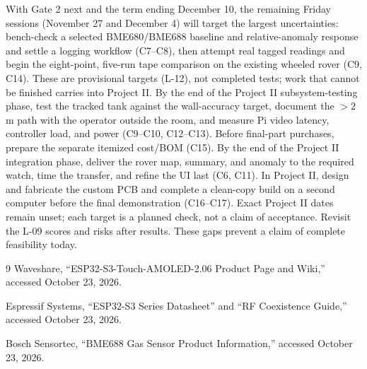 \documentclass[conference,onecolumn,letterpaper]{IEEEtran}
\begin{document}
With Gate 2 next and the term ending December 10, the remaining Friday sessions (November 27 and December 4) will target the largest uncertainties: bench-check a selected BME680/BME688 baseline and relative-anomaly response and settle a logging workflow (C7--C8), then attempt real tagged readings and begin the eight-point, five-run tape comparison on the existing wheeled rover (C9, C14). These are provisional targets (L-12), not completed tests; work that cannot be finished carries into Project II. By the end of the Project II subsystem-testing phase, test the tracked tank against the wall-accuracy target, document the $>2$ m path with the operator outside the room, and measure Pi video latency, controller load, and power (C9--C10, C12--C13). Before final-part purchases, prepare the separate itemized cost/BOM (C15). By the end of the Project II integration phase, deliver the rover map, summary, and anomaly to the required watch, time the transfer, and refine the UI last (C6, C11). In Project II, design and fabricate the custom PCB and complete a clean-copy build on a second computer before the final demonstration (C16--C17). Exact Project II dates remain unset; each target is a planned check, not a claim of acceptance. Revisit the L-09 scores and risks after results. These gaps prevent a claim of complete feasibility today.

\begin{thebibliography}{9}
\small
{}
Waveshare, ``ESP32-S3-Touch-AMOLED-2.06 Product Page and Wiki,'' accessed October 23, 2026.

Espressif Systems, ``ESP32-S3 Series Datasheet'' and ``RF Coexistence Guide,'' accessed October 23, 2026.

Bosch Sensortec, ``BME688 Gas Sensor Product Information,'' accessed October 23, 2026.
\end{thebibliography}
\end{document}
